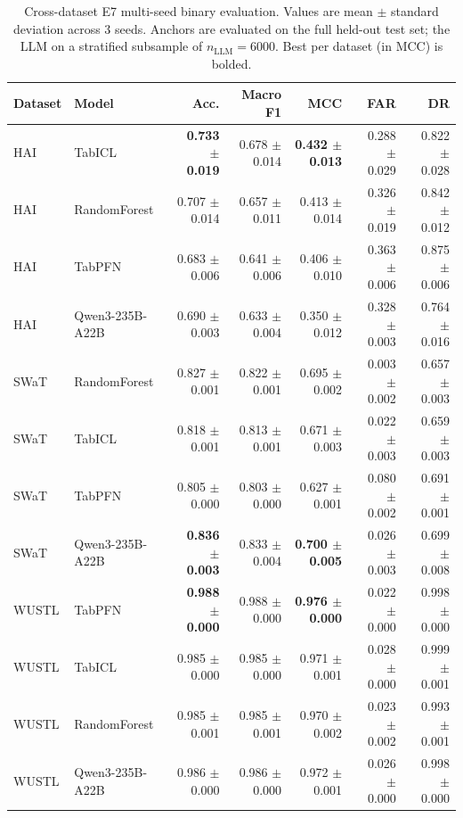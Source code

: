 \begin{table}[t]
\centering
\caption{Cross-dataset E7 multi-seed binary evaluation. Values are mean $\pm$ standard deviation across 3 seeds. Anchors are evaluated on the full held-out test set; the LLM on a stratified subsample of $n_{\mathrm{LLM}}=6000$. Best per dataset (in MCC) is bolded.}
\label{tab:headline}
\small
\begin{tabular}{llrrrrr}
\toprule
Dataset & Model & Acc. & Macro F1 & MCC & FAR & DR \\
\midrule
HAI & TabICL & \textbf{0.733 $\pm$ 0.019} & 0.678 $\pm$ 0.014 & \textbf{0.432 $\pm$ 0.013} & 0.288 $\pm$ 0.029 & 0.822 $\pm$ 0.028 \\
HAI & RandomForest & 0.707 $\pm$ 0.014 & 0.657 $\pm$ 0.011 & 0.413 $\pm$ 0.014 & 0.326 $\pm$ 0.019 & 0.842 $\pm$ 0.012 \\
HAI & TabPFN & 0.683 $\pm$ 0.006 & 0.641 $\pm$ 0.006 & 0.406 $\pm$ 0.010 & 0.363 $\pm$ 0.006 & 0.875 $\pm$ 0.006 \\
HAI & Qwen3-235B-A22B & 0.690 $\pm$ 0.003 & 0.633 $\pm$ 0.004 & 0.350 $\pm$ 0.012 & 0.328 $\pm$ 0.003 & 0.764 $\pm$ 0.016 \\
\midrule
SWaT & RandomForest & 0.827 $\pm$ 0.001 & 0.822 $\pm$ 0.001 & 0.695 $\pm$ 0.002 & 0.003 $\pm$ 0.002 & 0.657 $\pm$ 0.003 \\
SWaT & TabICL & 0.818 $\pm$ 0.001 & 0.813 $\pm$ 0.001 & 0.671 $\pm$ 0.003 & 0.022 $\pm$ 0.003 & 0.659 $\pm$ 0.003 \\
SWaT & TabPFN & 0.805 $\pm$ 0.000 & 0.803 $\pm$ 0.000 & 0.627 $\pm$ 0.001 & 0.080 $\pm$ 0.002 & 0.691 $\pm$ 0.001 \\
SWaT & Qwen3-235B-A22B & \textbf{0.836 $\pm$ 0.003} & 0.833 $\pm$ 0.004 & \textbf{0.700 $\pm$ 0.005} & 0.026 $\pm$ 0.003 & 0.699 $\pm$ 0.008 \\
\midrule
WUSTL & TabPFN & \textbf{0.988 $\pm$ 0.000} & 0.988 $\pm$ 0.000 & \textbf{0.976 $\pm$ 0.000} & 0.022 $\pm$ 0.000 & 0.998 $\pm$ 0.000 \\
WUSTL & TabICL & 0.985 $\pm$ 0.000 & 0.985 $\pm$ 0.000 & 0.971 $\pm$ 0.001 & 0.028 $\pm$ 0.000 & 0.999 $\pm$ 0.001 \\
WUSTL & RandomForest & 0.985 $\pm$ 0.001 & 0.985 $\pm$ 0.001 & 0.970 $\pm$ 0.002 & 0.023 $\pm$ 0.002 & 0.993 $\pm$ 0.001 \\
WUSTL & Qwen3-235B-A22B & 0.986 $\pm$ 0.000 & 0.986 $\pm$ 0.000 & 0.972 $\pm$ 0.001 & 0.026 $\pm$ 0.000 & 0.998 $\pm$ 0.000 \\
\bottomrule
\end{tabular}
\end{table}
